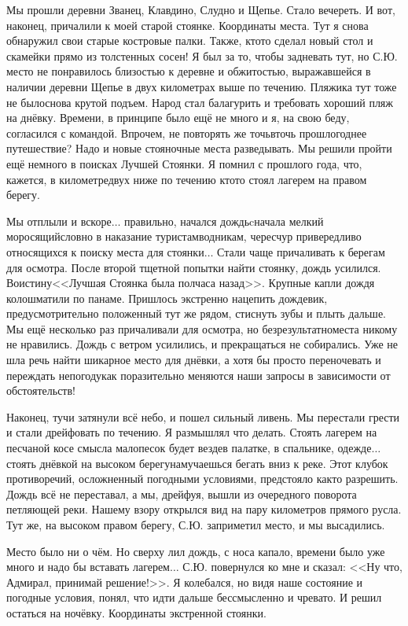 Мы прошли деревни Званец, Клавдино, Слудно и Щепье. Стало вечереть. И вот, наконец, причалили к моей старой стоянке. Координаты места\mdash \CoordsChagodoschaFifteenSecondDnevka. Тут я снова обнаружил свои старые костровые палки. Также, кто\sdash то сделал новый стол и скамейки прямо из толстенных сосен! Я был за то, чтобы задневать тут, но С.Ю. место не понравилось близостью к деревне и обжитостью, выражавшейся в наличии деревни Щепье в двух километрах выше по течению. Пляжика тут тоже не было\mdash снова крутой подъем. Народ стал балагурить и требовать хороший пляж на днёвку. Времени, в принципе было ещё не много и я, на свою беду, согласился с командой. Впрочем, не повторять же точь\sdash в\sdash точь прошлогоднее путешествие? Надо и новые стояночные места разведывать. Мы решили пройти ещё немного в поисках Лучшей Стоянки. Я помнил с прошлого года, что, кажется, в километре\sdash двух ниже по течению кто\sdash то стоял лагерем на правом берегу.

Мы отплыли и вскоре$\ldots$ правильно, начался дождь\mdash cначала мелкий моросящий\mdash словно в наказание туристам\sdash водникам, чересчур привередливо относящихся к поиску места для стоянки$\ldots$ Стали чаще причаливать к берегам для осмотра. После второй тщетной попытки найти стоянку, дождь усилился. Воистину\mdash <<Лучшая Стоянка была полчаса назад>>. Крупные капли дождя колошматили по панаме. Пришлось экстренно нацепить дождевик, предусмотрительно положенный тут же рядом, стиснуть зубы и плыть дальше. Мы ещё несколько раз причаливали для осмотра, но безрезультатно\mdash места никому не нравились. Дождь с ветром усилились, и прекращаться не собирались. Уже не шла речь найти шикарное место для днёвки, а хотя бы просто переночевать и переждать непогоду\mdash как поразительно меняются наши запросы в зависимости от обстоятельств!

Наконец, тучи затянули всё небо, и пошел сильный ливень. Мы перестали грести и стали дрейфовать по течению. Я размышлял что делать. Стоять лагерем на песчаной косе смысла мало\mdash песок будет везде\mdash в палатке, в спальнике, одежде$\ldots$ стоять днёвкой на высоком берегу\mdash намучаешься бегать вниз к реке. Этот клубок противоречий, осложненный погодными условиями, предстояло как\sdash то разрешить. Дождь всё не переставал, а мы, дрейфуя, вышли из очередного поворота петляющей реки. Нашему взору открылся вид на пару километров прямого русла. Тут же, на высоком правом берегу, С.Ю. заприметил место, и мы высадились. 

Место было ни о чём. Но сверху лил дождь, с носа капало, времени было уже много и надо бы вставать лагерем$\ldots$ С.Ю. повернулся ко мне и сказал: <<Ну что, Адмирал, принимай решение!>>. Я колебался, но видя наше состояние и погодные условия, понял, что идти дальше бессмысленно и чревато. И решил остаться на ночёвку. Координаты экстренной стоянки\mdash \CoordsChagodoschaSixteenEmergencyNignt.


